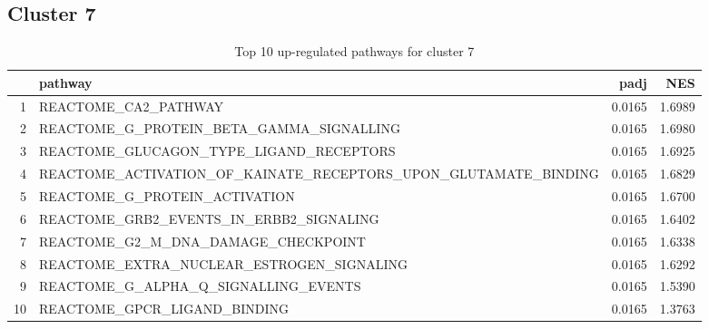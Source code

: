 \documentclass{article}
\begin{document}
\subsection{Cluster 7 }
\begin{table}[H]
\centering
\begin{tabularx}{\textwidth}{rlrr}
  \hline
 & pathway & padj & NES \\ 
  \hline
1 & REACTOME\_CA2\_PATHWAY & 0.0165 & 1.6989 \\ 
  2 & REACTOME\_G\_PROTEIN\_BETA\_GAMMA\_SIGNALLING & 0.0165 & 1.6980 \\ 
  3 & REACTOME\_GLUCAGON\_TYPE\_LIGAND\_RECEPTORS & 0.0165 & 1.6925 \\ 
  4 & REACTOME\_ACTIVATION\_OF\_KAINATE\_RECEPTORS\_UPON\_GLUTAMATE\_BINDING & 0.0165 & 1.6829 \\ 
  5 & REACTOME\_G\_PROTEIN\_ACTIVATION & 0.0165 & 1.6700 \\ 
  6 & REACTOME\_GRB2\_EVENTS\_IN\_ERBB2\_SIGNALING & 0.0165 & 1.6402 \\ 
  7 & REACTOME\_G2\_M\_DNA\_DAMAGE\_CHECKPOINT & 0.0165 & 1.6338 \\ 
  8 & REACTOME\_EXTRA\_NUCLEAR\_ESTROGEN\_SIGNALING & 0.0165 & 1.6292 \\ 
  9 & REACTOME\_G\_ALPHA\_Q\_SIGNALLING\_EVENTS & 0.0165 & 1.5390 \\ 
  10 & REACTOME\_GPCR\_LIGAND\_BINDING & 0.0165 & 1.3763 \\ 
   \hline
\end{tabularx}
\caption{Top 10 up-regulated pathways for cluster 7} 
\label{tab:q3_2_7}
\end{table}
\end{document}
